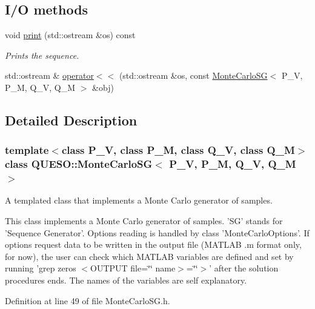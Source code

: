 \subsection*{I/\-O methods}
\begin{DoxyCompactItemize}
\item 
void \hyperlink{class_q_u_e_s_o_1_1_monte_carlo_s_g_aa920b82f555bc054c4e6495becbf0a40}{print} (std\-::ostream \&os) const 
\begin{DoxyCompactList}\small\item\em Prints the sequence. \end{DoxyCompactList}\item 
std\-::ostream \& \hyperlink{class_q_u_e_s_o_1_1_monte_carlo_s_g_a1a685a4dd5f9b017d82d8856fa534f85}{operator$<$$<$} (std\-::ostream \&os, const \hyperlink{class_q_u_e_s_o_1_1_monte_carlo_s_g}{Monte\-Carlo\-S\-G}$<$ P\-\_\-\-V, P\-\_\-\-M, Q\-\_\-\-V, Q\-\_\-\-M $>$ \&obj)
\end{DoxyCompactItemize}


\subsection{Detailed Description}
\subsubsection*{template$<$class P\-\_\-\-V, class P\-\_\-\-M, class Q\-\_\-\-V, class Q\-\_\-\-M$>$class Q\-U\-E\-S\-O\-::\-Monte\-Carlo\-S\-G$<$ P\-\_\-\-V, P\-\_\-\-M, Q\-\_\-\-V, Q\-\_\-\-M $>$}

A templated class that implements a Monte Carlo generator of samples. 

This class implements a Monte Carlo generator of samples. 'S\-G' stands for 'Sequence Generator'. Options reading is handled by class 'Monte\-Carlo\-Options'. If options request data to be written in the output file (M\-A\-T\-L\-A\-B .m format only, for now), the user can check which M\-A\-T\-L\-A\-B variables are defined and set by running 'grep zeros $<$\-O\-U\-T\-P\-U\-T file=\char`\"{}\char`\"{} name$>$=\char`\"{}\char`\"{}$>$' after the solution procedures ends. The names of the variables are self explanatory. 

Definition at line 49 of file Monte\-Carlo\-S\-G.\-h.



